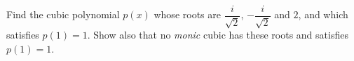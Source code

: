 Find the cubic polynomial $p(x)$ whose roots are $\dfrac{i}{\sqrt2}$, $-\dfrac{i}{\sqrt2}$ and $2$, and which satisfies $p(1)=1$. Show also that no \emph{monic} cubic has these roots and satisfies $p(1)=1$.
